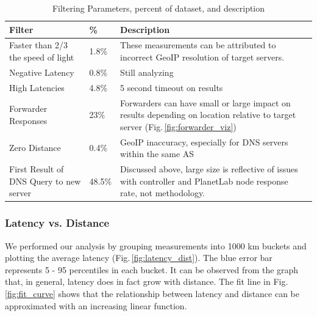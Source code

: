 \begin{table}[!htb]
  \begin{tabular}{p{2.3cm} | p{.6cm} | p{4.6cm}}
    \hline
    Filter & \% & Description \\
    \hline
    Faster than 2/3 the speed of light & 1.8\% & These measurements can be attributed to incorrect GeoIP resolution of target servers. \\
	\hline
	Negative Latency & 0.8\% & Still analyzing \\
	\hline
	High Latencies & 4.8\% & 5 second timeout on results \\
	\hline
	Forwarder Responses & 23\% & Forwarders can have small or large impact on results depending on location relative to target server (Fig.\,\ref{fig:forwarder_viz}) \\
	\hline
	Zero Distance & 0.4\% & GeoIP inaccuracy, especially for DNS servers within the same AS \\
	\hline
	First Result of DNS Query to new server & 48.5\% & Discussed above, large size is reflective of issues with controller and PlanetLab node response rate, not methodology. \\
    \hline
  \end{tabular}
  \vspace{1em}
  \caption{Filtering Parameters, percent of dataset, and description}
  \label{tab:filter}
\end{table}

\subsubsection{Latency vs. Distance}
We performed our analysis by grouping measurements into 1000 km buckets and plotting the average latency (Fig.\,\ref{fig:latency_dist}). The blue error bar represents 5 - 95 percentiles in each bucket. It can be observed from the graph that, in general, latency does in fact grow with distance. The fit line in Fig.\,\ref{fig:fit_curve} shows that the relationship between latency and distance can be approximated with an increasing linear function.

